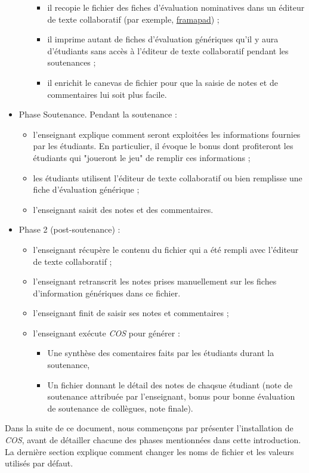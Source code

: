 \documentclass[11pt]{article}
\begin{document}
\begin{itemize}
\begin{itemize}
\begin{itemize}
\item il recopie le fichier des fiches d'évaluation nominatives dans
un éditeur de texte collaboratif (par exemple, \href{https://framapad.org/}{framapad}) ;
\item il imprime autant de fiches d'évaluation génériques qu'il y aura
d'étudiants sans accès à l'éditeur de texte collaboratif pendant
les soutenances ;
\item il enrichit le canevas de fichier pour que la saisie de notes
et de commentaires lui soit plus facile.
\end{itemize}
\end{itemize}
\item Phase Soutenance. Pendant la soutenance :
\begin{itemize}
\item l'enseignant explique comment seront exploitées les informations
fournies par les étudiants. En particulier, il évoque le bonus
dont profiteront les étudiants qui "joueront le jeu" de remplir
ces informations ;
\item les étudiants utilisent l'éditeur de texte collaboratif ou bien
remplisse une fiche d'évaluation générique ;
\item l'enseignant saisit des notes et des commentaires.
\end{itemize}
\item Phase 2 (post-soutenance) :
\begin{itemize}
\item l'enseignant récupère le contenu du fichier qui a été rempli avec
l'éditeur de texte collaboratif ;
\item l'enseignant retranscrit les notes prises manuellement sur les
fiches d'information génériques dans ce fichier.
\item l'enseignant finit de saisir ses notes et commentaires ;
\item l'enseignant exécute \emph{COS} pour générer :
\begin{itemize}
\item Une synthèse des comentaires faits par les étudiants durant la
soutenance,
\item Un fichier donnant le détail des notes de chaqsue étudiant (note
de soutenance attribuée par l'enseignant, bonus pour bonne
évaluation de soutenance de collègues, note finale).
\end{itemize}
\end{itemize}
\end{itemize}

Dans la suite de ce document, nous commençons par présenter
l'installation de \emph{COS}, avant de détailler chacune des phases
mentionnées dans cette introduction. La dernière section explique
comment changer les noms de fichier et les valeurs utilisés par
défaut.
\end{document}
